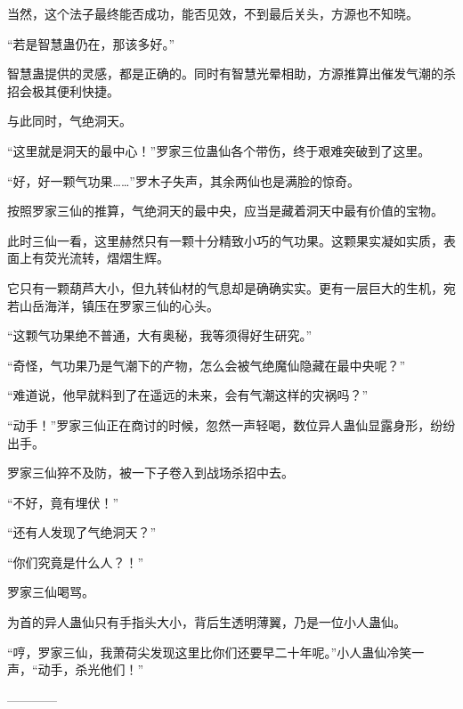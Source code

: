 \begin{this_body}
当然，这个法子最终能否成功，能否见效，不到最后关头，方源也不知晓。

“若是智慧蛊仍在，那该多好。”

智慧蛊提供的灵感，都是正确的。同时有智慧光晕相助，方源推算出催发气潮的杀招会极其便利快捷。

与此同时，气绝洞天。

“这里就是洞天的最中心！”罗家三位蛊仙各个带伤，终于艰难突破到了这里。

“好，好一颗气功果……”罗木子失声，其余两仙也是满脸的惊奇。

按照罗家三仙的推算，气绝洞天的最中央，应当是藏着洞天中最有价值的宝物。

此时三仙一看，这里赫然只有一颗十分精致小巧的气功果。这颗果实凝如实质，表面上有荧光流转，熠熠生辉。

它只有一颗葫芦大小，但九转仙材的气息却是确确实实。更有一层巨大的生机，宛若山岳海洋，镇压在罗家三仙的心头。

“这颗气功果绝不普通，大有奥秘，我等须得好生研究。”

“奇怪，气功果乃是气潮下的产物，怎么会被气绝魔仙隐藏在最中央呢？”

“难道说，他早就料到了在遥远的未来，会有气潮这样的灾祸吗？”

“动手！”罗家三仙正在商讨的时候，忽然一声轻喝，数位异人蛊仙显露身形，纷纷出手。

罗家三仙猝不及防，被一下子卷入到战场杀招中去。

“不好，竟有埋伏！”

“还有人发现了气绝洞天？”

“你们究竟是什么人？！”

罗家三仙喝骂。

为首的异人蛊仙只有手指头大小，背后生透明薄翼，乃是一位小人蛊仙。

“哼，罗家三仙，我萧荷尖发现这里比你们还要早二十年呢。”小人蛊仙冷笑一声，“动手，杀光他们！”

------------

\end{this_body}

